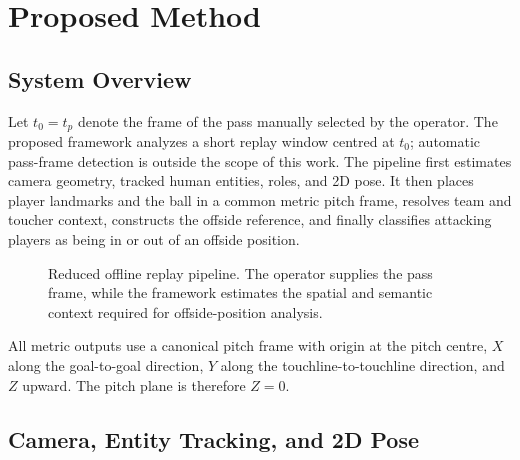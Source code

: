 \documentclass[runningheads]{llncs}
\begin{document}
\section{Proposed Method}
\label{sec:method}

\subsection{System Overview}
\label{subsec:overview}

Let $t_0=t_p$ denote the frame of the pass manually selected by the operator. The proposed framework analyzes a short replay window centred at $t_0$; automatic pass-frame detection is outside the scope of this work. The pipeline first estimates camera geometry, tracked human entities, roles, and 2D pose. It then places player landmarks and the ball in a common metric pitch frame, resolves team and toucher context, constructs the offside reference, and finally classifies attacking players as being in or out of an offside position.

\begin{figure}[H]
    \centering
    \caption{Reduced offline replay pipeline. The operator supplies the pass frame, while the framework estimates the spatial and semantic context required for offside-position analysis.}
    \label{fig:pipeline}
\end{figure}

All metric outputs use a canonical pitch frame with origin at the pitch centre, $X$ along the goal-to-goal direction, $Y$ along the touchline-to-touchline direction, and $Z$ upward. The pitch plane is therefore $Z=0$.

\subsection{Camera, Entity Tracking, and 2D Pose}
\label{subsec:perception}
\end{document}
